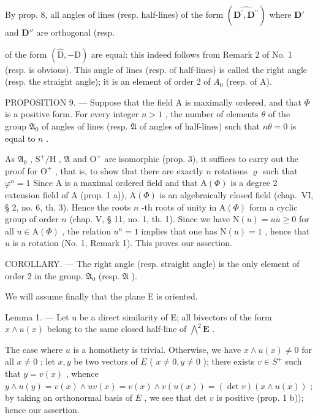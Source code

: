 By prop. 8, all angles of lines (resp. half-lines) of the form \((\widehat{\mathbf{D}^{\prime},\mathbf{D}^{\prime\prime}})\) where \(\mathbf{D}'\) and \(\mathbf{D}''\) are orthogonal (resp.

of the form \((\widehat{\mathrm{D}}, -\mathrm{D})\) are equal: this indeed follows from Remark 2 of No. 1 (resp. is obvious). This angle of lines (resp. of half-lines) is called the right angle (resp. the straight angle); it is an element of order 2 of \(A_{0}\) (resp. of A).

PROPOSITION 9. --- Suppose that the field A is maximally ordered, and that \(\Phi\) is a positive form. For every integer \(n>1\) , the number of elements \(\theta\) of the group \(\mathfrak{A}_{0}\) of angles of lines (resp. \(\mathfrak{A}\) of angles of half-lines) such that \(n\theta=0\) is equal to \(n\) .

As \(\mathfrak{A}_{0}\) , \(\mathrm{S}^{+}/\mathrm{H}\) , \(\mathfrak{A}\) and \(\mathrm{O}^{+}\) are isomorphic (prop. 3), it suffices to carry out the proof for \(\mathrm{O}^{+}\) , that is, to show that there are exactly \(n\) rotations \(\varrho\) such that \(\varphi^{n}=1\) Since A is a maximal ordered field and that \(\mathrm{A}(\Phi)\) is a degree 2 extension field of A (prop. 1 a)), \(\mathrm{A}(\Phi)\) is an algebraically closed field (chap.~VI, § 2, no. 6, th. 3). Hence the roots \(n\) -th roots of unity in \(\mathrm{A}(\Phi)\) form a cyclic group of order \(n\) (chap. V, § 11, no. 1, th. 1). Since we have \(\mathrm{N}(u)=u\overline{u}\geqslant0\) for all \(u\in\mathrm{A}(\Phi)\) , the relation \(u^{n}=1\) implies that one has \(\mathrm{N}(u)=1\) , hence that \(u\) is a rotation (No. 1, Remark 1). This proves our assertion.

COROLLARY. --- The right angle (resp. straight angle) is the only element of order 2 in the group. \(\mathfrak{A}_{0}\) (resp. \(\mathfrak{A}\) ).

We will assume finally that the plane E is oriented.

Lemma 1. --- Let u be a direct similarity of E; all bivectors of the form \(x \wedge u(x)\) belong to the same closed half-line of \(\bigwedge^{2}\mathbf{E}\) .

The case where \(u\) is a homothety is trivial. Otherwise, we have \(x \wedge u(x) \neq 0\) for all \(x \neq 0\) ; let \(x, y\) be two vectors of \(E\) ( \(x \neq 0, y \neq 0\) ); there exists \(v \in S^+\) such that \(y = v(x)\) , whence \(y \wedge u(y) = v(x) \wedge uv(x) = v(x) \wedge v(u(x)) = (\det v)(x \wedge u(x))\) ; by taking an orthonormal basis of \(E\) , we see that det \(v\) is positive (prop. 1 b)); hence our assertion.

